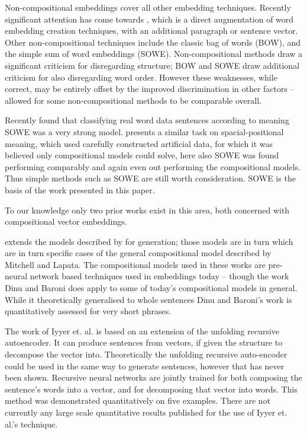 \documentclass[]{scrartcl}
\numberwithin{equation}{section}
\numberwithin{figure}{section}
\theoremstyle{plain}
\theoremstyle{definition}
\begin{document}
Non-compositional embeddings cover all other embedding techniques. Recently significant attention has come towards  \cite{le2014distributed}, which is a direct augmentation of word embedding creation techniques, with an additional paragraph or sentence vector. Other non-compositional techniques include the classic bag of words (BOW), and the simple sum of word embeddings (SOWE). Non-compositional methods draw a significant criticism for disregarding structure; BOW and SOWE draw additional criticism for also disregarding word order. However these weaknesses, while correct, may be entirely offset by the improved discrimination in other factors -- allowed for some non-compositional methods to be comparable overall. 


Recently \cite{White2015SentVecMeaning} found that classifying real word data sentences according to meaning SOWE was a very strong model. \cite{RitterPosition} presents a similar task on spacial-positional meaning, which used carefully constructed artificial data, for which it was believed only compositional models could solve, here also SOWE was found performing comparably and again even out performing the compositional models. Thus simple methods such as SOWE are still worth consideration. SOWE is the basis of the work presented in this paper.


To our knowledge only two prior works exist in this area, both concerned with compositional vector embeddings.

\cite{Dinu2014CompositionalGeneration}  extends the models described by \cite{zanzotto2010estimating, Guevara2010} for generation; those models are in turn which are in turn specific cases of the general compositional model described by Mitchell and Lapata\cite{Mitchell2008}. The compositional models used in these works are pre-neural network based techniques used in embeddings today -- though the work Dinu and Baroni does apply to some of today's compositional models in general. While it theoretically generalised to whole sentences Dinu and Baroni's work is quantitatively assessed for very short phrases.


The work of Iyyer et. al. \cite{iyyer2014generating} is based on an extension of the unfolding recursive autoencoder\cite{SocherEtAl2011:PoolRAE}. It can produce sentences from vectors, if given the structure to decompose the vector into. Theoretically the unfolding recursive auto-encoder could be used in the same way to generate sentences, however that has never been shown. Recursive neural networks are jointly trained for both composing the sentence's words into a vector, and for decomposing that vector into words. This method was demonstrated quantitatively on five examples. There are not currently any large scale quantitative results published for the use of Iyyer et. al.'s technique.
\end{document}
